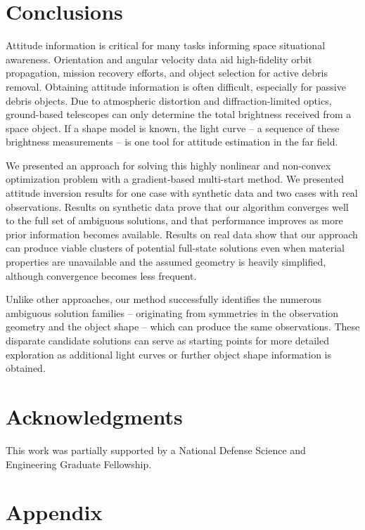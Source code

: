 \documentclass[a4paper,twocolumn]{spaceDebrisC} %
\begin{document}
\section{Conclusions}

Attitude information is critical for many tasks informing space situational awareness. Orientation and angular velocity data aid high-fidelity orbit propagation, mission recovery efforts, and object selection for active debris removal. Obtaining attitude information is often difficult, especially for passive debris objects. Due to atmospheric distortion and diffraction-limited optics, ground-based telescopes can only determine the total brightness received from a space object. If a shape model is known, the light curve -- a sequence of these brightness measurements -- is one tool for attitude estimation in the far field. 

We presented an approach for solving this highly nonlinear and non-convex optimization problem with a gradient-based multi-start method. We presented attitude inversion results for one case with synthetic data and two cases with real observations. Results on synthetic data prove that our algorithm converges well to the full set of ambiguous solutions, and that performance improves as more prior information becomes available. Results on real data show that our approach can produce viable clusters of potential full-state solutions even when material properties are unavailable and the assumed geometry is heavily simplified, although convergence becomes less frequent.

Unlike other approaches, our method successfully identifies the numerous ambiguous solution families -- originating from symmetries in the observation geometry and the object shape -- which can produce the same observations. These disparate candidate solutions can serve as starting points for more detailed exploration as additional light curves or further object shape information is obtained.

\section*{Acknowledgments}

This work was partially supported by a National Defense Science and Engineering Graduate Fellowship.

\section*{Appendix}
\end{document}

